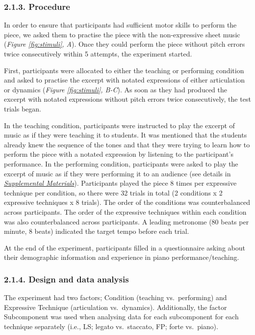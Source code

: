 \documentclass[
  english,
  man,floatsintext]{apa6}
\begin{document}
\hypertarget{procedure}{%
\subsubsection{2.1.3. Procedure}\label{procedure}}

In order to ensure that participants had sufficient motor skills to perform the piece, we asked them to practise the piece with the non-expressive sheet music (\emph{Figure \ref{fig:stimuli}, A}). Once they could perform the piece without pitch errors twice consecutively within 5 attempts, the experiment started.

First, participants were allocated to either the teaching or performing condition and asked to practise the excerpt with notated expressions of either articulation or dynamics (\emph{Figure \ref{fig:stimuli}, B-C}). As soon as they had produced the excerpt with notated expressions without pitch errors twice consecutively, the test trials began.

In the teaching condition, participants were instructed to play the excerpt of music as if they were teaching it to students. It was mentioned that the students already knew the sequence of the tones and that they were trying to learn how to perform the piece with a notated expression by listening to the participant's performance. In the performing condition, participants were asked to play the excerpt of music as if they were performing it to an audience (see details in \emph{\protect\hyperlink{supplemental}{Supplemental Materials}}). Participants played the piece 8 times per expressive technique per condition, so there were 32 trials in total (2 conditions x 2 expressive techniques x 8 trials). The order of the conditions was counterbalanced across participants. The order of the expressive techniques within each condition was also counterbalanced across participants. A leading metronome (80 beats per minute, 8 beats) indicated the target tempo before each trial.

At the end of the experiment, participants filled in a questionnaire asking about their demographic information and experience in piano performance/teaching.

\hypertarget{design-and-data-analysis}{%
\subsubsection{2.1.4. Design and data analysis}\label{design-and-data-analysis}}

The experiment had two factors; Condition (teaching vs.~performing) and Expressive Technique (articulation vs.~dynamics). Additionally, the factor Subcomponent was used when analysing data for each subcomponent for each technique separately (i.e., LS; legato vs.~staccato, FP; forte vs.~piano).
\end{document}
